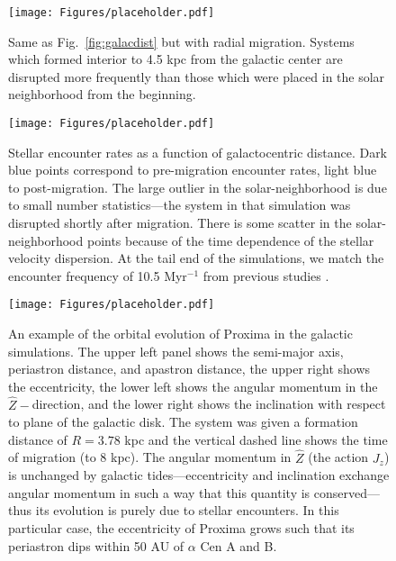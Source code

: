 \documentclass[preprint,12pt]{aastex}
\begin{document}
\begin{figure}
\centering
\texttt{[image: Figures/placeholder.pdf]}
\caption{Same as Fig.~\ref{fig:galacdist} but with radial migration.
  Systems which formed interior to 4.5 kpc from the galactic center
  are disrupted more frequently than
  those which were placed in the solar neighborhood from the
  beginning. }
\label{fig:galacdistmigr}
\end{figure}

\begin{figure}
\centering
\texttt{[image: Figures/placeholder.pdf]}
\caption{Stellar encounter rates as a function of galactocentric distance.
  Dark blue points correspond to pre-migration encounter rates, light 
  blue to post-migration. The large outlier in the 
  solar-neighborhood is due to small number statistics---the system 
  in that simulation was disrupted shortly after migration. There is some 
  scatter in the solar-neighborhood points because of the time dependence 
  of the stellar velocity dispersion. At the tail end of the simulations, we 
  match the encounter frequency of 10.5 Myr$^{-1}$ from previous 
  studies \citep{Garciasanchez2001,Rickman2008}.}
\label{fig:encrates}
\end{figure}


\begin{figure}
\centering
\texttt{[image: Figures/placeholder.pdf]}
\caption{An example of the orbital evolution of Proxima in the galactic 
  simulations. The upper left panel shows the semi-major axis, periastron 
  distance, and apastron distance, the upper right shows the eccentricity, 
  the lower left shows the angular momentum in the $\hat{Z}-$direction, 
  and the lower right shows the inclination with respect to plane of the 
  galactic disk. The system was given a formation distance of $R = 3.78$ 
  kpc and the vertical dashed line shows the time of migration (to 8 kpc). 
  The angular momentum in $\hat{Z}$ (the action $J_z$) is unchanged by 
  galactic tides---eccentricity and inclination exchange angular momentum 
  in such a way that this quantity is conserved---thus its evolution is purely 
  due to stellar encounters. In this particular case, the eccentricity of Proxima 
  grows such that its periastron dips within 50 AU of $\alpha$ Cen A and B.}
\label{fig:galevolution}
\end{figure}
\end{document}
